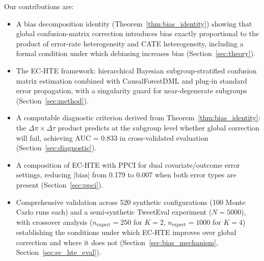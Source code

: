 Our contributions are:
\begin{itemize}
    \item A bias decomposition identity (Theorem~\ref{thm:bias_identity}) showing that global confusion-matrix correction introduces bias exactly proportional to the product of error-rate heterogeneity and CATE heterogeneity, including a formal condition under which debiasing increases bias (Section~\ref{sec:theory}).
    \item The EC-HTE framework: hierarchical Bayesian subgroup-stratified confusion matrix estimation combined with CausalForestDML and plug-in standard error propagation, with a singularity guard for near-degenerate subgroups (Section~\ref{sec:method}).
    \item A computable diagnostic criterion derived from Theorem~\ref{thm:bias_identity}: the $\Delta\pi \times \Delta\tau$ product predicts at the subgroup level whether global correction will fail, achieving AUC = 0.833 in cross-validated evaluation (Section~\ref{sec:diagnostic}).
    \item A composition of EC-HTE with PPCI for dual covariate/outcome error settings, reducing $|\text{bias}|$ from 0.179 to 0.007 when both error types are present (Section~\ref{sec:ppci}).
    \item Comprehensive validation across 520 synthetic configurations (100 Monte Carlo runs each) and a semi-synthetic TweetEval experiment ($N{=}5000$), with crossover analysis ($n_{\text{expert}}{=}250$ for $K{=}2$, $n_{\text{expert}}{=}1000$ for $K{=}4$) establishing the conditions under which EC-HTE improves over global correction and where it does not (Section~\ref{sec:bias_mechanism}, Section~\ref{sec:ec_hte_eval}).
\end{itemize}
